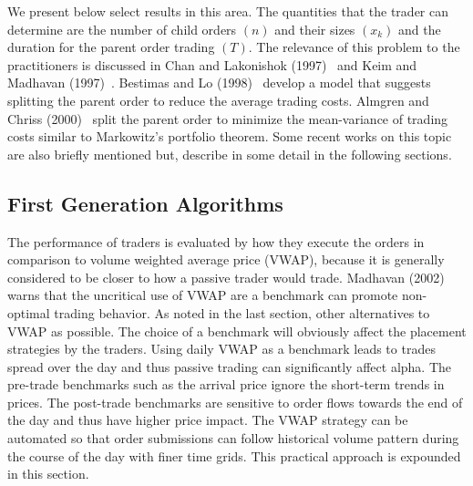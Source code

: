 We present below select results in this area. The quantities that the trader can determine are the number of child orders $(n)$ and their sizes $(x_k)$ and the duration for the parent order trading $(T)$. The relevance of this problem to the practitioners is discussed in Chan and Lakonishok (1997)~\cite{lakon} and Keim and Madhavan (1997)~\cite{madhavan}. Bestimas and Lo (1998)~\cite{berlo} develop a model that suggests splitting the parent order to reduce the average trading costs. Almgren and Chriss (2000)~\cite{alm2000} split the parent order to minimize the mean-variance of trading costs similar to Markowitz's portfolio theorem. Some recent works on this topic are also briefly mentioned but, describe in some detail in the following sections.



\subsection{First Generation Algorithms \label{sec:first_gen}}


The performance of traders is evaluated by how they execute the orders in comparison to volume weighted average price (VWAP), because it is generally considered to be closer to how a passive trader would trade. Madhavan (2002)~\cite{mad_a02} warns that the uncritical use of VWAP are a benchmark can promote non-optimal trading behavior. As noted in the last section, other alternatives to VWAP as possible. The choice of a benchmark will obviously affect the placement strategies by the traders. Using daily VWAP as a benchmark leads to trades spread over the day and thus passive trading can significantly affect alpha. The pre-trade benchmarks such as the arrival price ignore the short-term trends in prices. The post-trade benchmarks are sensitive to order flows towards the end of the day and thus have higher price impact. The VWAP strategy can be automated so that order submissions can follow historical volume pattern during the course of the day with finer time grids. This practical approach is expounded in this section.


